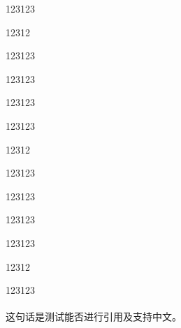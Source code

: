 \documentclass[fontset=windows]{article}
\newcommand{\upcite}[1]{\textsuperscript{\cite{#1}}}
\begin{document}






123123

12312

123123

123123

123123

123123

12312

123123

123123

123123

123123

12312

123123

这句话是测试能否进行引用及支持中文\upcite{1}。

\end{document}

